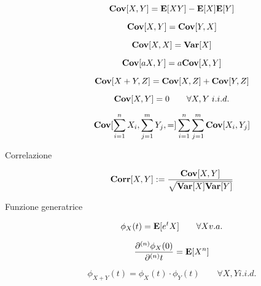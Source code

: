 \begin{description}
		\begin{equation}
		\mathbf{Cov}[X,Y] = \mathbf{E}[XY]-\mathbf{E}[X]\mathbf{E}[Y]
		\end{equation}
		
		\begin{equation}
		\mathbf{Cov}[X,Y] = \mathbf{Cov}[Y,X]
		\end{equation}
		
		\begin{equation}
		\mathbf{Cov}[X,X] = \mathbf{Var}[X]
		\end{equation}
		
		\begin{equation}
		\mathbf{Cov}[aX,Y] = a\mathbf{Cov}[X,Y]
		\end{equation}
		
		\begin{equation}
		\mathbf{Cov}[X+Y,Z] = \mathbf{Cov}[X,Z]+\mathbf{Cov}[Y,Z]
		\end{equation}
		
		\begin{equation}
		\mathbf{Cov}[X,Y] = 0 \qquad\forall X,Y \; i.i.d.
		\end{equation}
		
		\begin{equation}
		\mathbf{Cov}[\sum_{i=1}^{n}X_{i},\sum_{j=1}^{m}Y_{j},=] \sum_{i=1}^{n}\sum_{j=1}^{m}\mathbf{Cov}[X_{i},Y_{j}]
		\end{equation}
	
	\item [Correlazione]
		\begin{equation}
		\mathbf{Corr}[X,Y] := \frac{\mathbf{Cov}[X,Y]}{\sqrt{\mathbf{Var}[X]\mathbf{Var}[Y]}}
		\end{equation}
	
	\item [Funzione generatrice]
		\begin{equation}
		\phi_{X}(t) = \mathbf{E}[e^tX] \qquad\forall X v.a.
		\end{equation}
		
		\begin{equation}
		\frac{\partial^{(n)} \phi_{X}(0)}{\partial^{(n)}t} = \mathbf{E}[X^{n}]
		\end{equation}
		
		\begin{equation}
		\phi_{X+Y}(t) = \phi_{X}(t) \cdot \phi_{Y}(t) \qquad\forall X,Y i.i.d.
		\end{equation}
	
\end{description}



